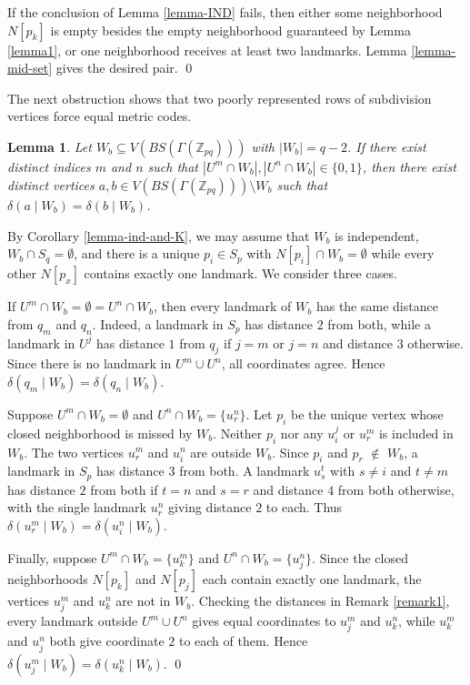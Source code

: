\documentclass[12pt]{article}
\renewenvironment{proof}{{\bf \noindent Proof.}}{\qed}
\newtheorem{lemma}[theorem]{Lemma}
\begin{document}
\begin{proof}
If the conclusion of Lemma \ref{lemma-IND} fails, then either some neighborhood $N[p_k]$ is empty besides the empty neighborhood guaranteed by Lemma \ref{lemma1}, or one neighborhood receives at least two landmarks. Lemma \ref{lemma-mid-set} gives the desired pair.
\end{proof}

\noindent The next obstruction shows that two poorly represented rows of subdivision vertices force equal metric codes.
\begin{lemma}\label{lemmaD}
Let $W_b\subseteq V(BS(\Gamma(\mathbb Z_{pq})))$ with $|W_b|=q-2$. If there exist distinct indices $m$ and $n$ such that $|U^m\cap W_b|,|U^n\cap W_b|\in\{0,1\}$, then there exist distinct vertices $a,b\in V(BS(\Gamma(\mathbb Z_{pq})))\setminus W_b$ such that $\delta(a\mid W_b)=\delta(b\mid W_b)$.
\end{lemma}

\begin{proof}
By Corollary \ref{lemma-ind-and-K}, we may assume that $W_b$ is independent, $W_b\cap S_q=\emptyset$, and there is a unique $p_i\in S_p$ with $N[p_i]\cap W_b=\emptyset$ while every other $N[p_x]$ contains exactly one landmark. We consider three cases.

If $U^m\cap W_b=\emptyset=U^n\cap W_b$, then every landmark of $W_b$ has the same distance from $q_m$ and $q_n$. Indeed, a landmark in $S_p$ has distance $2$ from both, while a landmark in $U^j$ has distance $1$ from $q_j$ if $j=m$ or $j=n$ and distance $3$ otherwise. Since there is no landmark in $U^m\cup U^n$, all coordinates agree. Hence $\delta(q_m\mid W_b)=\delta(q_n\mid W_b)$.

Suppose $U^m\cap W_b=\emptyset$ and $U^n\cap W_b=\{u_r^n\}$. Let $p_i$ be the unique vertex whose closed neighborhood is missed by $W_b$. Neither \( p_i \) nor any \( u_i^j \) or \( u_r^m \) is included in \( W_b \). The two vertices $u_r^m$ and $u_i^n$ are outside $W_b$. Since $p_i$ and $p_r$ $\notin$ $W_b$, a landmark in $S_p$ has distance $3$ from both. A landmark $u_s^t$ with $s\neq i$ and $t\neq m$ has distance $2$ from both if $t=n$ and $s=r$ and distance $4$ from both otherwise, with the single landmark $u_r^n$ giving distance $2$ to each. Thus $\delta(u_r^m\mid W_b)=\delta(u_i^n\mid W_b)$.

Finally, suppose $U^m\cap W_b=\{u_k^m\}$ and $U^n\cap W_b=\{u_j^n\}$. Since the closed neighborhoods $N[p_k]$ and $N[p_j]$ each contain exactly one landmark, the vertices $u_j^m$ and $u_k^n$ are not in $W_b$. Checking the distances in Remark \ref{remark1}, every landmark outside $U^m\cup U^n$ gives equal coordinates to $u_j^m$ and $u_k^n$, while $u_k^m$ and $u_j^n$ both give coordinate $2$ to each of them. Hence $\delta(u_j^m\mid W_b)=\delta(u_k^n\mid W_b)$.
\end{proof}
\end{document}
